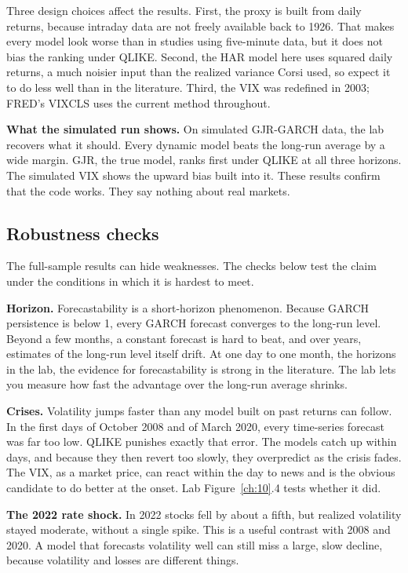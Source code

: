 Three design choices affect the results. First, the proxy is built from daily returns, because intraday data are not freely available back to 1926. That makes every model look worse than in studies using five-minute data, but it does not bias the ranking under QLIKE. Second, the HAR model here uses squared daily returns, a much noisier input than the realized variance Corsi used, so expect it to do less well than in the literature. Third, the VIX was redefined in 2003; FRED's VIXCLS uses the current method throughout.

\textbf{What the simulated run shows.} On simulated GJR-GARCH data, the lab recovers what it should. Every dynamic model beats the long-run average by a wide margin. GJR, the true model, ranks first under QLIKE at all three horizons. The simulated VIX shows the upward bias built into it. These results confirm that the code works. They say nothing about real markets.

\subsection{Robustness checks}
\label{sec:10-stress}

The full-sample results can hide weaknesses. The checks below test the claim under the conditions in which it is hardest to meet.

\textbf{Horizon.} Forecastability is a short-horizon phenomenon. Because GARCH persistence is below 1, every GARCH forecast converges to the long-run level. Beyond a few months, a constant forecast is hard to beat, and over years, estimates of the long-run level itself drift. At one day to one month, the horizons in the lab, the evidence for forecastability is strong in the literature. The lab lets you measure how fast the advantage over the long-run average shrinks.

\textbf{Crises.} Volatility jumps faster than any model built on past returns can follow. In the first days of October 2008 and of March 2020, every time-series forecast was far too low. QLIKE punishes exactly that error. The models catch up within days, and because they then revert too slowly, they overpredict as the crisis fades. The VIX, as a market price, can react within the day to news and is the obvious candidate to do better at the onset. Lab Figure~\ref{ch:10}.4 tests whether it did.

\textbf{The 2022 rate shock.} In 2022 stocks fell by about a fifth, but realized volatility stayed moderate, without a single spike. This is a useful contrast with 2008 and 2020. A model that forecasts volatility well can still miss a large, slow decline, because volatility and losses are different things.

